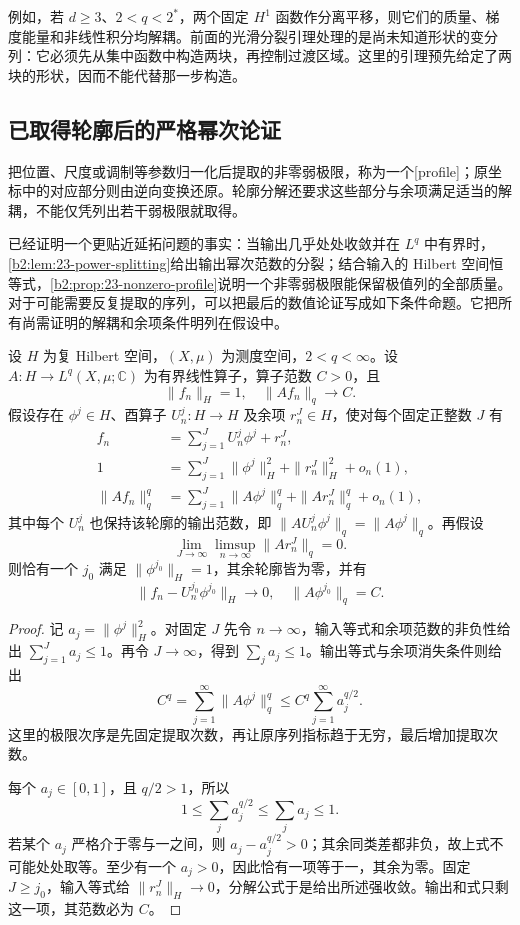 例如，若 \(d\ge3\)、\(2<q<2^*\)，两个固定 \(H^1\) 函数作分离平移，则它们的质量、梯度能量和非线性积分均解耦。前面的光滑分裂引理处理的是尚未知道形状的变分列：它必须先从集中函数中构造两块，再控制过渡区域。这里的引理预先给定了两块的形状，因而不能代替那一步构造。

\subsection{已取得轮廓后的严格幂次论证}
\label{b2:subsec:F-profile-rigidity}

把位置、尺度或调制等参数归一化后提取的非零弱极限，称为一个[profile]；原坐标中的对应部分则由逆向变换还原。轮廓分解还要求这些部分与余项满足适当的解耦，不能仅凭列出若干弱极限就取得。

\ProseParagraphBreak

已经证明一个更贴近延拓问题的事实：当输出几乎处处收敛并在 \(L^q\) 中有界时，\cref{b2:lem:23-power-splitting}给出输出幂次范数的分裂；结合输入的 Hilbert 空间恒等式，\cref{b2:prop:23-nonzero-profile}说明一个非零弱极限能保留极值列的全部质量。对于可能需要反复提取的序列，可以把最后的数值论证写成如下条件命题。它把所有尚需证明的解耦和余项条件明列在假设中。

\begin{proposition}[轮廓分解下的单轮廓结论]
\label{b2:prop:F-profile-rigidity}
设 \(H\) 为复 Hilbert 空间，\((X,\mu)\) 为测度空间，\(2<q<\infty\)。设 \(A:H\to L^q(X,\mu;\mathbb C)\) 为有界线性算子，算子范数 \(C>0\)，且
\[
 \|f_n\|_H=1,\quad \|Af_n\|_q\longrightarrow C.
\]
假设存在 \(\phi^j\in H\)、酉算子 \(U_n^j:H\to H\) 及余项 \(r_n^J\in H\)，使对每个固定正整数 \(J\) 有
\begin{align*}
 f_n&=\sum_{j=1}^J U_n^j\phi^j+r_n^J,\\
 1&=\sum_{j=1}^J\|\phi^j\|_H^2+\|r_n^J\|_H^2+o_n(1),\\
 \|Af_n\|_q^q
 &=\sum_{j=1}^J\|A\phi^j\|_q^q+\|Ar_n^J\|_q^q+o_n(1),
\end{align*}
其中每个 \(U_n^j\) 也保持该轮廓的输出范数，即 \(\|AU_n^j\phi^j\|_q=\|A\phi^j\|_q\)。再假设
\[
 \lim_{J\to\infty}\limsup_{n\to\infty}\|Ar_n^J\|_q=0.
\]
则恰有一个 \(j_0\) 满足 \(\|\phi^{j_0}\|_H=1\)，其余轮廓皆为零，并有
\[
 \|f_n-U_n^{j_0}\phi^{j_0}\|_H\longrightarrow0,
 \quad \|A\phi^{j_0}\|_q=C.
\]
\end{proposition}
\begin{proof}
记 \(a_j=\|\phi^j\|_H^2\)。对固定 \(J\) 先令 \(n\to\infty\)，输入等式和余项范数的非负性给出 \(\sum_{j=1}^J a_j\le1\)。再令 \(J\to\infty\)，得到 \(\sum_j a_j\le1\)。输出等式与余项消失条件则给出
\[
 C^q=\sum_{j=1}^{\infty}\|A\phi^j\|_q^q
 \le C^q\sum_{j=1}^{\infty}a_j^{q/2}.
\]
这里的极限次序是先固定提取次数，再让原序列指标趋于无穷，最后增加提取次数。

每个 \(a_j\in[0,1]\)，且 \(q/2>1\)，所以
\[
 1\le\sum_j a_j^{q/2}\le\sum_j a_j\le1.
\]
若某个 \(a_j\) 严格介于零与一之间，则 \(a_j-a_j^{q/2}>0\)；其余同类差都非负，故上式不可能处处取等。至少有一个 \(a_j>0\)，因此恰有一项等于一，其余为零。固定 \(J\ge j_0\)，输入等式给 \(\|r_n^J\|_H\to0\)，分解公式于是给出所述强收敛。输出和式只剩这一项，其范数必为 \(C\)。
\end{proof}

